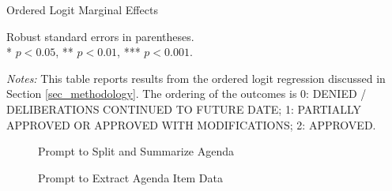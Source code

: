 \documentclass[12pt,english,hyperfootnotes=false,hidelinks]{article}
\begin{document}
\pagebreak

\begin{table}[H]
  \centering
  \caption{Ordered Logit Marginal Effects}
  \begin{adjustbox}{max width=\textwidth}
    \begin{threeparttable}
      
        \begin{tablenotes}[flushleft]\footnotesize
            \item[] \parbox[t]{\linewidth}{%
            Robust standard errors in parentheses.\\
            * $p<0.05$, ** $p<0.01$, *** $p<0.001$.}
        \item \textit{Notes:} This table reports results from the ordered logit regression 
        discussed in Section \ref{sec_methodology}. The ordering of the outcomes is 
        0: DENIED / DELIBERATIONS CONTINUED TO FUTURE DATE; 
        1: PARTIALLY APPROVED OR APPROVED WITH MODIFICATIONS; 
        2: APPROVED.
      \end{tablenotes}
    \end{threeparttable}
  \end{adjustbox}
\end{table}


\pagebreak

\pagebreak

\pagebreak

\appendix

\renewcommand{\thefigure}{\thesection\arabic{figure}}
\renewcommand{\thetable}{\thesection\arabic{table}}

\makeatletter
{}
\makeatother



\pagebreak

\begin{figure}[H]
\caption{Prompt to Split and Summarize Agenda} \label{fig_split_agenda_prompt}
\vspace{-0.5cm}
\begin{center}
\fbox{
\begin{minipage}{\textwidth}
\texttt{
\footnotesize

}
\end{minipage}
}
\end{center}
\end{figure}

\pagebreak

\begin{figure}[H]
\caption{Prompt to Extract Agenda Item Data} \label{fig_agenda_items_prompt}
\vspace{-0.6cm}
\begin{center}
\fbox{
\begin{minipage}{\textwidth}
\texttt{
\footnotesize

}
\end{minipage}
}
\end{center}
\end{figure}
\end{document}
